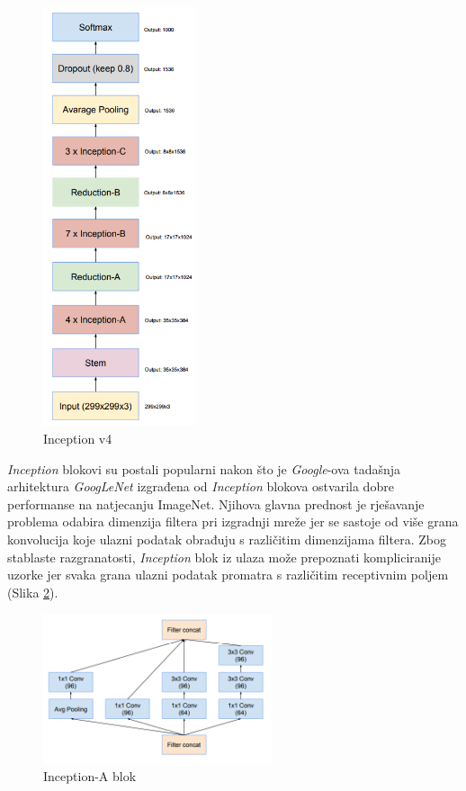 \documentclass[times, utf8, proizvoljni, numeric]{fer}
\begin{document}
\begin{figure}[!ht]
	\begin{center}
		\captionsetup{justification=centering}
		\includegraphics[width=0.4\textwidth]{./imgs/inceptionv4.png}
		\caption{Inception v4 \cite{Inceptionv4}}
		\label{fg:inceptionv4}
	\end{center}
\end{figure}

\textit{Inception} blokovi su postali popularni nakon što je \textit{Google}-ova tadašnja arhitektura \textit{GoogLeNet} izgrađena od \textit{Inception} blokova ostvarila dobre performanse na natjecanju ImageNet. Njihova glavna prednost je rješavanje problema odabira dimenzija filtera pri izgradnji mreže jer se sastoje od više grana konvolucija koje ulazni podatak obrađuju s različitim dimenzijama filtera. Zbog stablaste razgranatosti, \textit{Inception} blok iz ulaza može prepoznati kompliciranije uzorke jer svaka grana ulazni podatak promatra s različitim receptivnim poljem (Slika \ref{fg:inception_blok_a}).
	
\begin{figure}[H]
	\begin{center}
		\captionsetup{justification=centering}
		\includegraphics[width=0.6\textwidth]{./imgs/inception_blok_a.png}
		\caption{Inception-A blok  \cite{Inceptionv4}}
		\label{fg:inception_blok_a}
	\end{center}
\end{figure}
\end{document}
